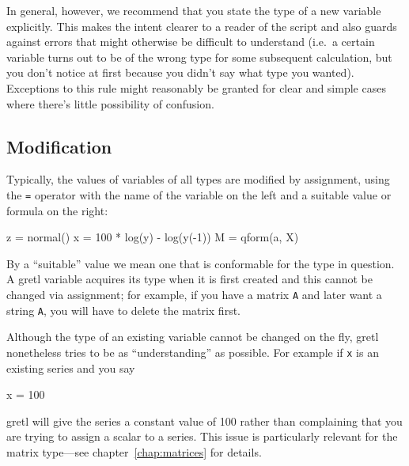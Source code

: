 In general, however, we recommend that you state the type of a new
variable explicitly. This makes the intent clearer to a reader of the
script and also guards against errors that might otherwise be
difficult to understand (i.e.\ a certain variable turns out to be of
the wrong type for some subsequent calculation, but you don't notice
at first because you didn't say what type you wanted). Exceptions to
this rule might reasonably be granted for clear and simple cases where
there's little possibility of confusion.

\subsection{Modification}

Typically, the values of variables of all types are modified
by assignment, using the \texttt{=} operator with the name of the
variable on the left and a suitable value or formula on the right:

\begin{code}
z = normal()
x = 100 * log(y) - log(y(-1))
M = qform(a, X)
\end{code}

By a ``suitable'' value we mean one that is conformable for the type
in question. A gretl variable acquires its type when it is first
created and this cannot be changed via assignment; for example, if you
have a matrix \texttt{A} and later want a string \texttt{A}, you will
have to delete the matrix first.


Although the type of an existing variable cannot be changed on the
fly, gretl nonetheless tries to be as ``understanding'' as
possible. For example if \texttt{x} is an existing series and you say

\begin{code}
x = 100
\end{code} 

gretl will give the series a constant value of 100 rather than
complaining that you are trying to assign a scalar to a series. This
issue is particularly relevant for the matrix type---see
chapter~\ref{chap:matrices} for details.

